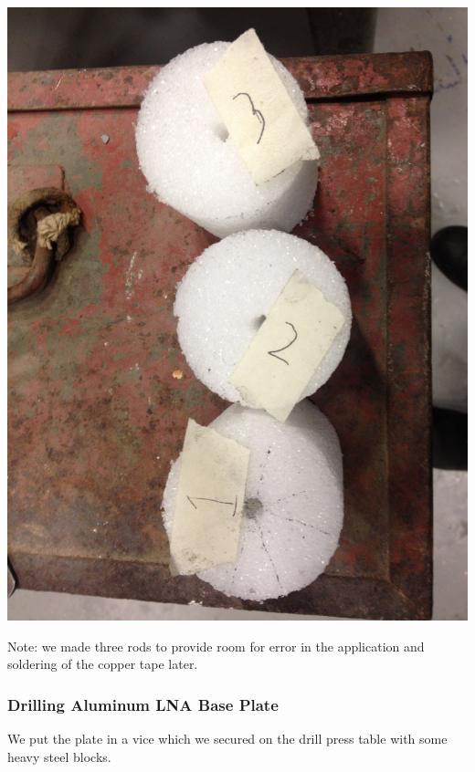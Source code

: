 \documentclass[11pt]{article} %
\begin{document}
\begin{center}
\includegraphics[scale=0.09]{feed/02.jpeg}
\end{center}

Note: we made three rods to provide room for error in the application and soldering of the copper tape later.

\subsubsection{Drilling Aluminum LNA Base Plate}

We put the plate in a vice which we secured on the drill press table with some heavy steel blocks.
\end{document}
